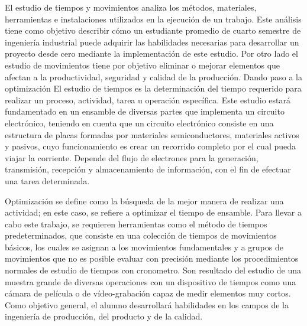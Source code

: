     El estudio de tiempos y movimientos analiza los métodos, materiales, herramientas e instalaciones utilizados en la ejecución de un trabajo. Este análisis tiene como objetivo describir cómo un estudiante promedio de cuarto semestre de ingeniería industrial puede adquirir las habilidades necesarias para desarrollar un proyecto desde cero mediante la implementación de este estudio.\cite{patent}
    Por otro lado el estudio de movimientos tiene por objetivo eliminar o mejorar elementos que afectan a la productividad, seguridad y calidad de la producción. Dando paso a la optimización  El estudio de tiempos es la determinación del tiempo requerido para realizar un proceso, actividad, tarea u operación específica.\cite{parra2020analisis}
     Este estudio estará fundamentado en un ensamble de diversas partes que implementa un circuito electrónico,
     teniendo en cuenta que un circuito electrónico consiste en una estructura de placas formadas por materiales semiconductores, materiales activos y pasivos, cuyo funcionamiento es crear un recorrido completo por el cual pueda viajar la corriente. Depende del flujo de electrones para la generación, transmisión, recepción y almacenamiento de información, con el fin de efectuar una tarea determinada. \cite{thomas2007principios}
    
     Optimización se define como la búsqueda de la mejor manera de realizar una actividad; en este caso, se refiere a optimizar el tiempo de ensamble. Para llevar a cabo este trabajo, se requieren herramientas como el método de tiempos predeterminados, que consiste en una colección de tiempos de movimientos básicos, los cuales se asignan a los movimientos fundamentales y a grupos de movimientos que no es posible evaluar con precisión mediante los procedimientos normales de estudio de tiempos con cronometro. Son resultado del estudio de una muestra grande de diversas operaciones con un dispositivo de tiempos como una cámara de película o de vídeo-grabación capaz de medir elementos muy cortos. \cite{niebel1980ingenieria} \cite{vidalesaplicacion}
     Como objetivo general, el alumno desarrollará habilidades en los campos de la ingeniería de producción, del producto y de la calidad.
